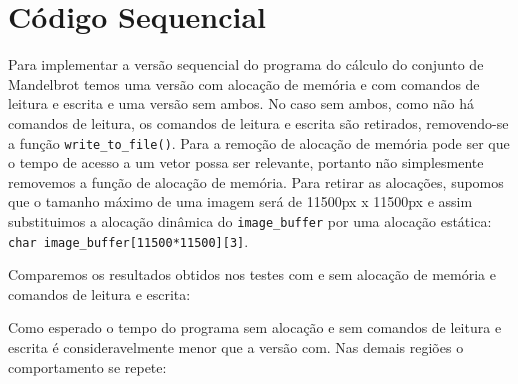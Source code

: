 \documentclass[12pt]{article}
\newcommand{\code}[1]{\texttt{#1}}
\begin{document}
\section{Código Sequencial}
Para implementar a versão sequencial do programa do cálculo do conjunto de Mandelbrot temos uma versão com alocação de memória e com comandos de leitura e escrita e uma versão sem ambos. No caso sem ambos, como não há comandos de leitura, os comandos de leitura e escrita são retirados, removendo-se a função \code{write\_to\_file()}. Para a remoção de alocação de memória pode ser que o tempo de acesso a um vetor possa ser relevante, portanto não simplesmente removemos a função de alocação de memória. Para retirar as alocações, supomos que o tamanho máximo de uma imagem será de 11500px x 11500px e assim substituimos a alocação dinâmica do \code{image\_buffer} por uma alocação estática: \code{char image\_buffer[11500*11500][3]}.

Comparemos os resultados obtidos nos testes com e sem alocação de memória e comandos de leitura e escrita:

\begin{figure}[H]
\end{figure}

Como esperado o tempo do programa sem alocação e sem comandos de leitura e escrita é consideravelmente menor que a versão com. Nas demais regiões o comportamento se repete:
\end{document}
